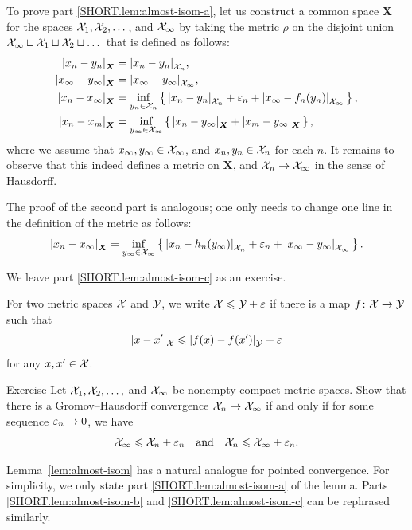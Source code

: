 To prove part \ref{SHORT.lem:almost-isom-a}, let us construct a common space $\bm{X}$ for the spaces $\mathcal{X}_1,\mathcal{X}_2,\dots$, and $\mathcal{X}_\infty$
by taking the metric $\rho$ on the disjoint union $\mathcal{X}_\infty\sqcup\mathcal{X}_1\sqcup\mathcal{X}_2\sqcup\dots$ that is defined as follows:
\begin{align*}
\dist{x_n}{y_n}{\bm{X}}&=\dist{x_n}{y_n}{\spc{X}_n},
\\
\dist{x_\infty}{y_\infty}{\bm{X}}&=\dist{x_\infty}{y_\infty}{\spc{X}_\infty},
\\
\dist{x_n}{x_\infty}{\bm{X}}
&=\inf_{y_n\in \spc{X}_n}\set{\dist{x_n}{y_n}{\spc{X}_n}+\eps_n+\dist{x_\infty}{f_n(y_n)}{\spc{X}_\infty}}{},
\\
\dist{x_n}{x_m}{\bm{X}}
&=\inf_{y_\infty\in\spc{X}_\infty}\set{\dist{x_n}{y_\infty}{\bm{X}}+\dist{x_m}{y_\infty}{\bm{X}}}{},
\end{align*}
where we assume that $x_\infty,y_\infty\in \mathcal{X}_\infty$, and $x_n,y_n\in \mathcal{X}_n$ for each $n$. 
It remains to observe that this indeed defines a metric on $\bm{X}$, and $\mathcal{X}_n\to \mathcal{X}_\infty$ in the sense of Hausdorff.

The proof of the second part is analogous; one only needs to change one line in the definition of the metric as follows:
\[\dist{x_n}{x_\infty}{\bm{X}}
=
\inf_{y_\infty\in \spc{X}_\infty}\set{\dist{x_n}{h_n(y_\infty)}{\spc{X}_n}+\eps_n+\dist{x_\infty}{y_\infty}{\spc{X}_\infty}}{}.\]

We leave part \ref{SHORT.lem:almost-isom-c} as an exercise.
\qedsf

For two metric spaces $\mathcal{X}$ and $\mathcal{Y}$,
we write $\mathcal{X}\leqslant \mathcal{Y}+\varepsilon$ if
there is a map $f\colon\mathcal{X}\to \mathcal{Y}$ such that
\[\dist{x}{x'}{\spc{X}}\le \dist{f(x)}{f(x')}{\spc{Y}}+\eps\]
for any $x,x'\in \mathcal{X}$.

\begin{thm}{Exercise}\label{ex:GH-po}
Let $\mathcal{X}_1,\mathcal{X}_2,\dots,$ and $\mathcal{X}_\infty$ be nonempty compact metric spaces.
Show that there is a Gromov--Hausdorff convergence $\spc{X}_n\z\to\spc{X}_\infty$ if and only if for some sequence $\varepsilon_n\to 0$,
we have
\[\mathcal{X}_\infty\leqslant \mathcal{X}_n+\varepsilon_n\quad\text{and}\quad \mathcal{X}_n\leqslant \mathcal{X}_\infty+\varepsilon_n.\]
\end{thm}

Lemma~\ref{lem:almost-isom} has a natural analogue for pointed convergence.
For simplicity, we only state part \ref{SHORT.lem:almost-isom-a} of the lemma.
Parts \ref{SHORT.lem:almost-isom-b} and \ref{SHORT.lem:almost-isom-c} can be rephrased similarly.

